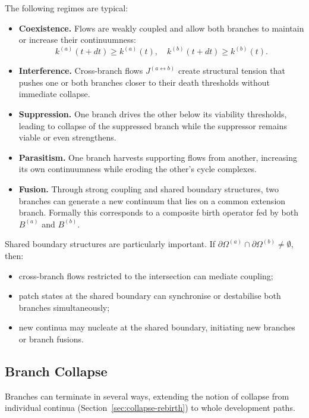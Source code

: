 The following regimes are typical:

\begin{itemize}
  \item \textbf{Coexistence.}\quad
        Flows are weakly coupled and allow both branches to maintain or
        increase their continuumness:
        \[
          k^{(a)}(t+dt) \ge k^{(a)}(t),\quad
          k^{(b)}(t+dt) \ge k^{(b)}(t).
        \]
  \item \textbf{Interference.}\quad
        Cross-branch flows \(J^{(a\leftrightarrow b)}\) create structural
        tension that pushes one or both branches closer to their death
        thresholds without immediate collapse.
  \item \textbf{Suppression.}\quad
        One branch drives the other below its viability thresholds, leading
        to collapse of the suppressed branch while the suppressor remains
        viable or even strengthens.
  \item \textbf{Parasitism.}\quad
        One branch harvests supporting flows from another, increasing its own
        continuumness while eroding the other's cycle complexes.
  \item \textbf{Fusion.}\quad
        Through strong coupling and shared boundary structures, two branches
        can generate a new continuum that lies on a common extension branch.
        Formally this corresponds to a composite birth operator fed by
        both \(B^{(a)}\) and \(B^{(b)}\).
\end{itemize}

Shared boundary structures are particularly important. If
\(\partial\Omega^{(a)}\cap\partial\Omega^{(b)}\neq\emptyset\), then:
\begin{itemize}
  \item cross-branch flows restricted to the intersection can mediate coupling;
  \item patch states at the shared boundary can synchronise or destabilise
        both branches simultaneously;
  \item new continua may nucleate at the shared boundary, initiating new
        branches or branch fusions.
\end{itemize}

\subsection{Branch Collapse}

Branches can terminate in several ways, extending the notion of collapse from
individual continua (Section~\ref{sec:collapse-rebirth}) to whole development
paths.

